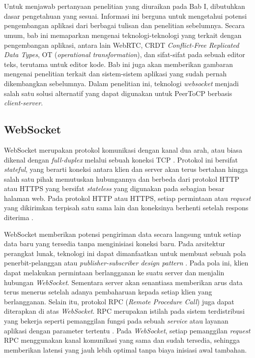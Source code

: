 \chapter{\babDua}
\label{bab:2}
Untuk menjawab pertanyaan penelitian yang diuraikan pada Bab I, dibutuhkan dasar pengetahuan yang sesuai. Informasi ini berguna untuk mengetahui potensi pengembangan aplikasi dari berbagai tulisan dan penelitian sebelumnya. Secara umum, bab ini memaparkan mengenai teknologi-teknologi yang terkait dengan pengembangan aplikasi, antara lain WebRTC, CRDT \textit{Conflict-Free Replicated Data Types}, OT (\textit{operational transformation}), dan sifat-sifat pada sebuah editor teks, terutama untuk editor kode. Bab ini juga akan memberikan gambaran mengenai penelitian terkait dan sistem-sistem aplikasi yang sudah pernah dikembangkan sebelumnya. Dalam penelitian ini, teknologi \textit{websocket} menjadi salah satu solusi alternatif yang dapat digunakan untuk PeerToCP berbasis \textit{client-server}.

\section{WebSocket}

WebSocket merupakan protokol komunikasi dengan kanal dua arah, atau biasa dikenal dengan \textit{full-duplex} melalui sebuah koneksi TCP \citep{fette2011websocket}. Protokol ini bersifat \textit{stateful}, yang berarti koneksi antara klien dan server akan terus bertahan hingga salah satu pihak memutuskan hubungannya \citep{pimentel2012communicating} dan berbeda dari protokol HTTP atau HTTPS yang bersifat \textit{stateless} yang digunakan pada sebagian besar halaman web. Pada protokol HTTP atau HTTPS, setiap permintaan atau \textit{request} yang dikirimkan terpisah satu sama lain dan koneksinya berhenti setelah respons diterima \citep{fielding1999hypertext}.

WebSocket memberikan potensi pengiriman data secara langsung untuk setiap data baru yang tersedia tanpa menginisiasi koneksi baru. Pada arsitektur perangkat lunak, teknologi ini dapat dimanfaatkan untuk membuat sebuah pola penerbit-pelanggan atau \textit{publisher-subscriber design pattern} \citep{ganaputra2015asynchronous}. Pada pola ini, klien dapat melakukan permintaan berlangganan ke suatu server dan menjalin hubungan \textit{WebSocket}. Sementara server akan senantiasa memberikan arus data terus menerus setelah adanya pembaharuan kepada setiap klien yang berlangganan. Selain itu, protokol RPC (\textit{Remote Procedure Call}) juga dapat diterapkan di atas \textit{WebSocket}. RPC merupakan istilah pada sistem terdistribusi yang bekerja seperti pemanggilan fungsi pada sebuah \textit{service} atau layanan aplikasi dengan parameter tertentu \citep{srinivasan1995rpc}. Pada \textit{WebSocket}, setiap pemanggilan \textit{request} RPC menggunakan kanal komunikasi yang sama dan sudah tersedia, sehingga memberikan latensi yang jauh lebih optimal tanpa biaya inisiasi awal tambahan.

